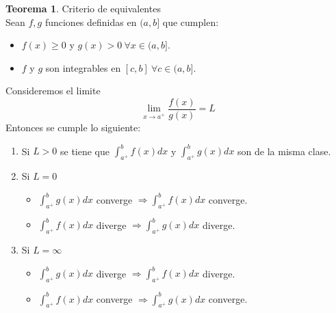 \documentclass[10pt]{article}
\theoremstyle{definition}
\newtheorem{theorem}{Teorema}[section]
\begin{document}
\begin{theorem}{Criterio de equivalentes}
    \\Sean $f,g$ funciones definidas en $(a,b]$ que cumplen:
    \begin{itemize}
        \item $f(x)\ge 0$ y $g(x)>0\ \forall x\in (a,b]$.
        \item $f$ y $g$ son integrables en $[c,b]\ \forall c\in (a,b]$.
    \end{itemize}
    Consideremos el limite $$\lim_{x \to a^+} \frac{f(x)}{g(x)}=L$$
    Entonces se cumple lo siguiente:
    \begin{enumerate}
        \item Si $L>0$ se tiene que $\int_{a^+}^{b} f(x) dx$ y $\int_{a^+}^{b} g(x) dx$ son de la misma clase.
        \item Si $L=0$
            \begin{itemize}
                \item $\int_{a^+}^{b} g(x) dx$ converge $\Rightarrow \int_{a^+}^{b} f(x) dx$ converge.
                \item $\int_{a^+}^{b} f(x) dx$ diverge $\Rightarrow \int_{a^+}^{b} g(x) dx$ diverge.
            \end{itemize}
        \item Si $L=\infty$
            \begin{itemize}
                \item $\int_{a^+}^{b} g(x) dx$ diverge $\Rightarrow \int_{a^+}^{b} f(x) dx$ diverge.
                \item $\int_{a^+}^{b} f(x) dx$ converge $\Rightarrow \int_{a^+}^{b} g(x) dx$ converge.
            \end{itemize}
    \end{enumerate}
\end{theorem}
\end{document}
